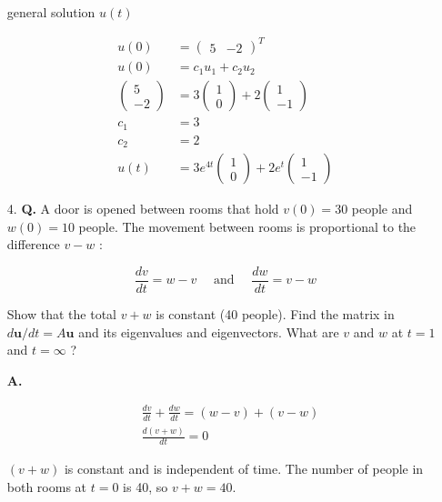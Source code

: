 \documentclass[main.tex]{subfiles}
\begin{document}
\begin{enumerate}
    general solution $u(t)$

    $$
    \begin{aligned}
    u(0)&=\left(\begin{array}{ll}
    5 & -2
    \end{array}\right)^{T}\\
    u(0)&=c_{1} u_{1}+c_{2} u_{2}\\
    \left(\begin{array}{c}
    5 \\
    -2
    \end{array}\right)&=3\left(\begin{array}{l}
    1 \\
    0
    \end{array}\right)+2\left(\begin{array}{l}
    1 \\
    -1
    \end{array}\right)\\
    c_{1}&=3\\
    c_{2}&=2\\
    u(t)&=3 e^{4 t}\left(\begin{array}{l}
    1 \\
    0
    \end{array}\right)+2 e^{t}\left(\begin{array}{l}
    1 \\
    -1
    \end{array}\right)
    \end{aligned}
    $$

    \item [4.] \textbf{Q.} A door is opened between rooms that hold $v(0)=30$ people and $w(0)=10$ people. The movement between rooms is proportional to the difference $v-w$ :
    
    $$
    \frac{d v}{d t}=w-v \quad \text { and } \quad \frac{d w}{d t}=v-w
    $$
    
    Show that the total $v+w$ is constant (40 people). Find the matrix in $d \boldsymbol{u} / d t=A \boldsymbol{u}$ and its eigenvalues and eigenvectors. What are $v$ and $w$ at $t=1$ and $t=\infty$ ? 
    
    \textbf{A.}

    $$
    \begin{aligned}
    &\frac{d v}{d t}+\frac{d w}{d t}=(w-v)+(v-w) \\
    &\frac{d(v+w)}{d t}=0
    \end{aligned}
    $$

    $(v+w)$ is constant and is independent of time. The number of people in both rooms at $t=0$ is 40, so $v+w=40$.


\end{enumerate}
\end{document}

